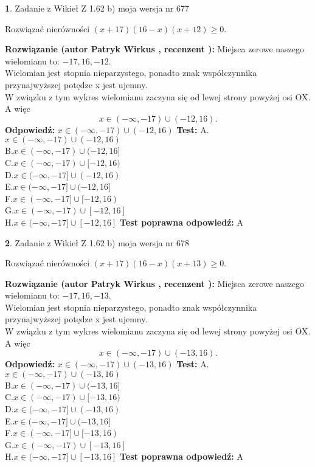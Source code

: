 \documentclass[12pt, a4paper]{article}
\theoremstyle{definition} %
\newtheorem{zad}{}
\newcommand{\zadStart}[1]{\begin{zad}#1\newline}
\newcommand{\zadStop}{\end{zad}}
\newcommand{\rozwStart}[2]{\noindent \textbf{Rozwiązanie (autor #1 , recenzent #2): }\newline}
\newcommand{\rozwStop}{\newline}
\newcommand{\odpStart}{\noindent \textbf{Odpowiedź:}\newline}
\newcommand{\odpStop}{\newline}
\newcommand{\testStart}{\noindent \textbf{Test:}\newline}
\newcommand{\testStop}{\newline}
\newcommand{\kluczStart}{\noindent \textbf{Test poprawna odpowiedź:}\newline}
\newcommand{\kluczStop}{\newline}
\begin{document}
\zadStart{Zadanie z Wikieł Z 1.62 b) moja wersja nr 677}

Rozwiązać nierówności $(x+17)(16-x)(x+12)\ge0$.
\zadStop
\rozwStart{Patryk Wirkus}{}
Miejsca zerowe naszego wielomianu to: $-17, 16, -12$.\\
Wielomian jest stopnia nieparzystego, ponadto znak współczynnika przy\linebreak najwyższej potędze x jest ujemny.\\ W związku z tym wykres wielomianu zaczyna się od lewej strony powyżej osi OX. A więc $$x \in (-\infty,-17) \cup (-12,16).$$
\rozwStop
\odpStart
$x \in (-\infty,-17) \cup (-12,16)$
\odpStop
\testStart
A.$x \in (-\infty,-17) \cup (-12,16)$\\
B.$x \in (-\infty,-17) \cup (-12,16]$\\
C.$x \in (-\infty,-17) \cup [-12,16)$\\
D.$x \in (-\infty,-17] \cup (-12,16)$\\
E.$x \in (-\infty,-17] \cup (-12,16]$\\
F.$x \in (-\infty,-17] \cup [-12,16)$\\
G.$x \in (-\infty,-17) \cup [-12,16]$\\
H.$x \in (-\infty,-17] \cup [-12,16]$
\testStop
\kluczStart
A
\kluczStop



\zadStart{Zadanie z Wikieł Z 1.62 b) moja wersja nr 678}

Rozwiązać nierówności $(x+17)(16-x)(x+13)\ge0$.
\zadStop
\rozwStart{Patryk Wirkus}{}
Miejsca zerowe naszego wielomianu to: $-17, 16, -13$.\\
Wielomian jest stopnia nieparzystego, ponadto znak współczynnika przy\linebreak najwyższej potędze x jest ujemny.\\ W związku z tym wykres wielomianu zaczyna się od lewej strony powyżej osi OX. A więc $$x \in (-\infty,-17) \cup (-13,16).$$
\rozwStop
\odpStart
$x \in (-\infty,-17) \cup (-13,16)$
\odpStop
\testStart
A.$x \in (-\infty,-17) \cup (-13,16)$\\
B.$x \in (-\infty,-17) \cup (-13,16]$\\
C.$x \in (-\infty,-17) \cup [-13,16)$\\
D.$x \in (-\infty,-17] \cup (-13,16)$\\
E.$x \in (-\infty,-17] \cup (-13,16]$\\
F.$x \in (-\infty,-17] \cup [-13,16)$\\
G.$x \in (-\infty,-17) \cup [-13,16]$\\
H.$x \in (-\infty,-17] \cup [-13,16]$
\testStop
\kluczStart
A
\kluczStop
\end{document}
